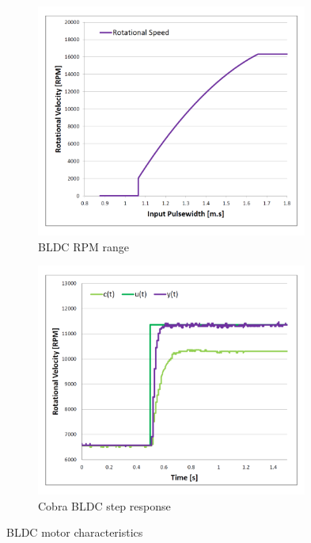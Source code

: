 \begin{figure}[hbtp]
\begin{subfigure}{0.48\textwidth}
\centering
\includegraphics[width=0.98\textwidth]{graphs/bldc-range}
\vspace{-8pt}
\caption{BLDC RPM range}
\label{fig:bldc-range}
\end{subfigure}
\begin{subfigure}{0.48\textwidth}
\centering
\includegraphics[width=0.98\textwidth]{graphs/BLDC-step}
\vspace{-8pt}
\caption{Cobra BLDC step response}
\label{fig:bldc-step}
\end{subfigure}
\vspace{-6pt}
\caption{BLDC motor characteristics}
\vspace{-20pt}
\end{figure}
